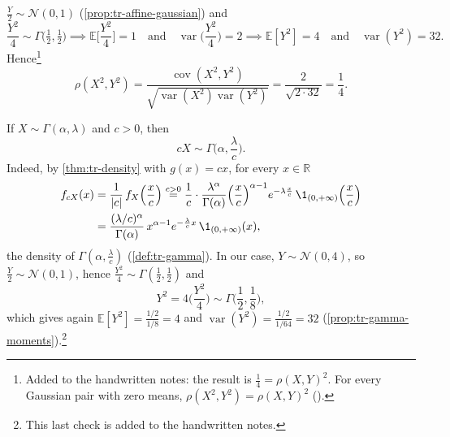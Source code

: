 \begin{example}
$\frac Y2\sim\mathcal N(0,1)$ (\cref{prop:tr-affine-gaussian}) and
\[
  \frac{Y^2}4\sim\Gamma\big(\tfrac12,\tfrac12\big)\implies
  \mathbb E\Big[\frac{Y^2}4\Big]=1\quad\text{and}\quad\operatorname{var}\Big(\frac{Y^2}4\Big)=2
  \implies\mathbb E[Y^2]=4\quad\text{and}\quad\operatorname{var}(Y^2)=32 .
\]
Hence\footnote{Added to the handwritten notes: the result is $\frac14=\rho(X,Y)^2$. For every
Gaussian pair with zero means, $\rho(X^2,Y^2)=\rho(X,Y)^2$ ().}
\[
  \rho(X^2,Y^2)=\frac{\operatorname{cov}(X^2,Y^2)}{\sqrt{\operatorname{var}(X^2)\operatorname{var}(Y^2)}}
  =\frac2{\sqrt{2\cdot32}}=\frac14 .
\]
\end{example}

\begin{remark}\label{rem:gc-gamma-scaling}
If $X\sim\Gamma(\alpha,\lambda)$ and $c>0$, then
\[
  cX\sim\Gamma\Big(\alpha,\frac\lambda c\Big).
\]
Indeed, by \cref{thm:tr-density} with $g(x)=cx$, for every $x\in\mathbb R$
\[
\begin{aligned}
  f_{cX}(x)&=\frac1{|c|}\,f_X\Big(\frac xc\Big)
  \overset{c>0}{=}\frac1c\cdot\frac{\lambda^\alpha}{\Gamma(\alpha)}\Big(\frac xc\Big)^{\alpha-1}e^{-\lambda\frac xc}\,\1_{(0,+\infty)}\Big(\frac xc\Big)\\
  &=\frac{(\lambda/c)^\alpha}{\Gamma(\alpha)}\,x^{\alpha-1}e^{-\frac\lambda cx}\,\1_{(0,+\infty)}(x),
\end{aligned}
\]
the density of $\Gamma(\alpha,\frac\lambda c)$ (\cref{def:tr-gamma}). In our case,
$Y\sim\mathcal N(0,4)$, so $\frac Y2\sim\mathcal N(0,1)$, hence
$\frac{Y^2}4\sim\Gamma(\frac12,\frac12)$ and
\[
  Y^2=4\Big(\frac{Y^2}4\Big)\sim\Gamma\Big(\frac12,\frac18\Big),
\]
which gives again $\mathbb E[Y^2]=\frac{1/2}{1/8}=4$ and $\operatorname{var}(Y^2)=\frac{1/2}{1/64}=32$
(\cref{prop:tr-gamma-moments}).\footnote{This last check is added to the handwritten notes.}
\end{remark}

